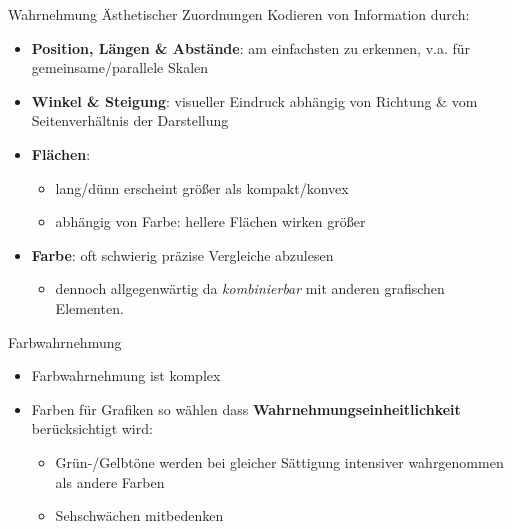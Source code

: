 \documentclass[
  10pt,
  ignorenonframetext,
]{beamer}
\providecommand{\tightlist}{%
  \setlength{\itemsep}{0pt}\setlength{\parskip}{0pt}}
\begin{document}
\begin{frame}{Wahrnehmung Ästhetischer Zuordnungen}
\label{wahrnehmung-uxe4sthetischer-zuordnungen}
Kodieren von Information durch:

\begin{itemize}
\tightlist
\item
  \textbf{Position, Längen \& Abstände}: am einfachsten zu erkennen,
  v.a. für gemeinsame/parallele Skalen
\item
  \textbf{Winkel \& Steigung}: visueller Eindruck abhängig von Richtung
  \& vom Seitenverhältnis der Darstellung
\item
  \textbf{Flächen}:

  \begin{itemize}
  \tightlist
  \item
    lang/dünn erscheint größer als kompakt/konvex
  \item
    abhängig von Farbe: hellere Flächen wirken größer
  \end{itemize}
\item
  \textbf{Farbe}: oft schwierig präzise Vergleiche abzulesen

  \begin{itemize}
  \tightlist
  \item
    dennoch allgegenwärtig da \emph{kombinierbar} mit anderen grafischen
    Elementen.
  \end{itemize}
\end{itemize}
\end{frame}

\begin{frame}{Farbwahrnehmung}
\label{farbwahrnehmung}
\begin{itemize}
\tightlist
\item
  Farbwahrnehmung ist komplex
\item
  Farben für Grafiken so wählen dass
  \textbf{Wahrnehmungseinheitlichkeit} berücksichtigt wird:

  \begin{itemize}
  \tightlist
  \item
    Grün-/Gelbtöne werden bei gleicher Sättigung intensiver wahrgenommen
    als andere Farben
  \item
    Sehschwächen mitbedenken
  \end{itemize}
\end{itemize}
\end{frame}
\end{document}
